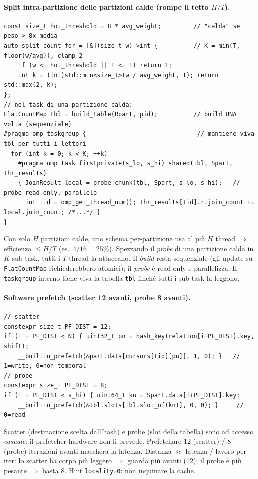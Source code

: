 \documentclass[11pt,a4paper]{article}
\begin{document}
\paragraph{Split intra-partizione delle partizioni calde (rompe il tetto $H/T$).}
\begin{lstlisting}[style=cpp]
const size_t hot_threshold = 8 * avg_weight;         // "calda" se peso > 8x media
auto split_count_for = [&](size_t w)->int {          // K = min(T, floor(w/avg)), clamp 2
    if (w <= hot_threshold || T <= 1) return 1;
    int k = (int)std::min<size_t>(w / avg_weight, T); return std::max(2, k);
};
// nel task di una partizione calda:
FlatCountMap tbl = build_table(Rpart, pid);          // build UNA volta (sequenziale)
#pragma omp taskgroup {                               // mantiene viva tbl per tutti i lettori
  for (int k = 0; k < K; ++k)
    #pragma omp task firstprivate(s_lo, s_hi) shared(tbl, Spart, thr_results)
    { JoinResult local = probe_chunk(tbl, Spart, s_lo, s_hi);   // probe read-only, parallelo
      int tid = omp_get_thread_num(); thr_results[tid].r.join_count += local.join_count; /*...*/ }
}
\end{lstlisting}
\begin{whybox}
Con solo $H$ partizioni calde, uno schema per-partizione usa al più $H$ thread $\Rightarrow$ efficienza $\le H/T$ (es.\ $4/16=25\%$). Spezzando il \emph{probe} di una partizione calda in $K$ sub-task, tutti i $T$ thread la attaccano. Il \emph{build} resta sequenziale (gli update su \texttt{FlatCountMap} richiederebbero atomici); il \emph{probe} è read-only e parallelizza. Il \texttt{taskgroup} interno tiene viva la tabella \texttt{tbl} finché tutti i sub-task la leggono.
\end{whybox}

\paragraph{Software prefetch (scatter 12 avanti, probe 8 avanti).}
\begin{lstlisting}[style=cpp]
// scatter
constexpr size_t PF_DIST = 12;
if (i + PF_DIST < N) { uint32_t pn = hash_key(relation[i+PF_DIST].key, shift);
    __builtin_prefetch(&part.data[cursors[tid][pn]], 1, 0); }   // 1=write, 0=non-temporal
// probe
constexpr size_t PF_DIST = 8;
if (i + PF_DIST < s_hi) { uint64_t kn = Spart.data[i+PF_DIST].key;
    __builtin_prefetch(&tbl.slots[tbl.slot_of(kn)], 0, 0); }     // 0=read
\end{lstlisting}
\begin{whybox}
Scatter (destinazione scelta dall'hash) e probe (slot della tabella) sono ad accesso \emph{casuale}: il prefetcher hardware non li prevede. Prefetchare 12 (scatter) / 8 (probe) iterazioni avanti maschera la latenza. Distanza $\approx$ latenza / lavoro-per-iter: lo scatter ha corpo più leggero $\Rightarrow$ guarda più avanti (12); il probe è più pesante $\Rightarrow$ basta 8. Hint \texttt{locality=0}: non inquinare la cache.
\end{whybox}
\end{document}
